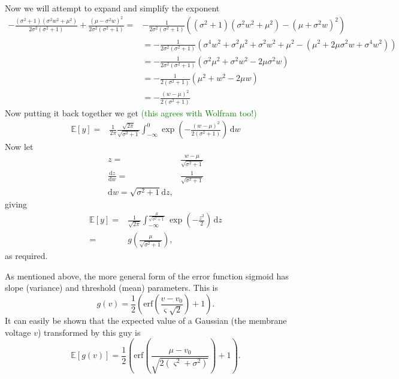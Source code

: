\documentclass[]{article}
\newcommand{\dean}[1]{\textcolor{green}{#1}}
\begin{document}
Now we will attempt to expand and simplify the exponent
\begin{align}
	-\frac{\left(\sigma^2+1\right)\left(\sigma^2w^2 +  \mu^2\right)}{2\sigma^2\left(\sigma^2+1\right)}+\frac{\left(\mu-\sigma^2w\right)^2}{2\sigma^2\left(\sigma^2+1\right)} =& -\frac{1}{2\sigma^2\left(\sigma^2+1\right)}\left(\left(\sigma^2+1\right)\left(\sigma^2w^2 +  \mu^2\right) - \left(\mu+\sigma^2w\right)^2\right) \\
	&= -\frac{1}{2\sigma^2\left(\sigma^2+1\right)}\left(\sigma^4w^2 + \sigma^2\mu^2 + \sigma^2w^2 + \mu^2 - \left(\mu^2 + 2\mu\sigma^2w + \sigma^4w^2\right)\right) \\
	&= -\frac{1}{2\sigma^2\left(\sigma^2+1\right)}\left(\sigma^2\mu^2 + \sigma^2w^2 - 2\mu\sigma^2w\right) \\
	&= -\frac{1}{2\left(\sigma^2+1\right)}\left(\mu^2 + w^2 - 2\mu w\right) \\
	&= -\frac{\left(w-\mu\right)^2}{2\left(\sigma^2+1\right)}
\end{align}
Now putting it back together we get \dean{(this agrees with Wolfram too!)}
\begin{align}
	\mathbb{E}\left[y\right] =& \frac{1}{2\pi}\frac{\sqrt{2\pi}}{\sqrt{\sigma^2+1}}\int_{-\infty}^{0} \exp\left(-\frac{\left(w-\mu\right)^2}{2\left(\sigma^2+1\right)}\right) \,\mathrm{d}w
\end{align}
Now let
\begin{align}
	z =& \frac{w-\mu}{\sqrt{\sigma^2+1}} \\
	\frac{\mathrm{d}z}{\mathrm{d}w} =& \frac{1}{\sqrt{\sigma^2+1}} \\
	\mathrm{d}w = \sqrt{\sigma^2+1}\mathrm{d}z,
\end{align}
giving
\begin{align}
	\mathbb{E}\left[y\right] =& \frac{1}{\sqrt{2\pi}}\int_{-\infty}^{\frac{\mu}{\sqrt{\sigma^2+1}}} \exp\left(-\frac{z^2}{2}\right) \,\mathrm{d}z \\
	=& g\left(\frac{\mu}{\sqrt{\sigma^2+1}}\right),
\end{align}
as required.

As mentioned above, the more general form of the error function sigmoid has slope (variance) and threshold (mean) parameters. This is
\begin{equation}
	g(v) = \frac{1}{2}\left(\mathrm{erf}\left(\frac{v-v_0}{\varsigma\sqrt{2}}\right) + 1\right).
\end{equation} 
It can easily be shown that the expected value of a Gaussian (the membrane voltage $v$) transformed by this guy is
\begin{equation}
	\mathbb{E}\left[g(v)\right] = \frac{1}{2} \left(\mathrm{erf}\left(\frac{\mu-v_0}{\sqrt{2\left(\varsigma^2+\sigma^2\right)}}\right) + 1\right).
\end{equation}
\end{document}
